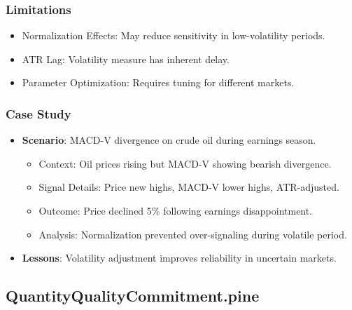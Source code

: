 \documentclass[12pt]{article}
\begin{document}
\subsubsection{Limitations}
\begin{itemize}
\item Normalization Effects: May reduce sensitivity in low-volatility periods.
\item ATR Lag: Volatility measure has inherent delay.
\item Parameter Optimization: Requires tuning for different markets.
\end{itemize}

\subsubsection{Case Study}
\begin{itemize}
\item \textbf{Scenario}: MACD-V divergence on crude oil during earnings season.
  \begin{itemize}
  \item Context: Oil prices rising but MACD-V showing bearish divergence.
  \item Signal Details: Price new highs, MACD-V lower highs, ATR-adjusted.
  \item Outcome: Price declined 5\% following earnings disappointment.
  \item Analysis: Normalization prevented over-signaling during volatile period.
  \end{itemize}
\item \textbf{Lessons}: Volatility adjustment improves reliability in uncertain markets.
\end{itemize}

\subsection{QuantityQualityCommitment.pine}
\label{subsec:qqc}
\end{document}
